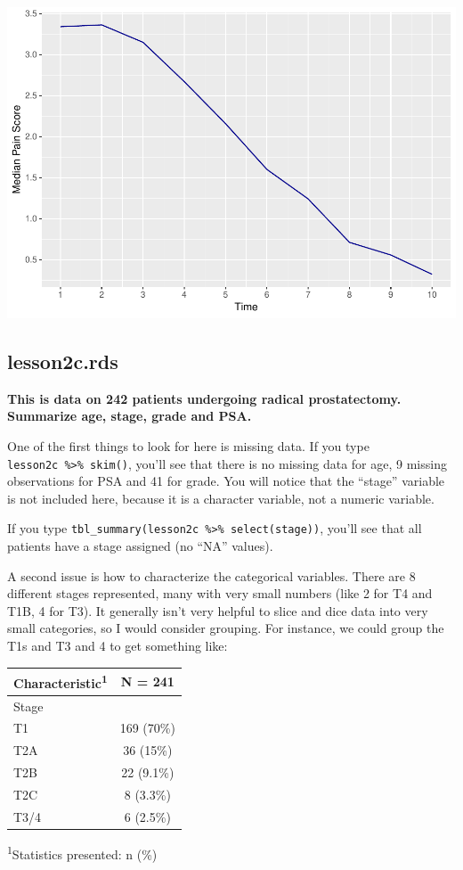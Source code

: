 \documentclass[]{book}
\begin{document}
\includegraphics{09-answers_files/figure-latex/week2f-1.pdf}

\hypertarget{lesson2c.rds}{%
\subsection{lesson2c.rds}\label{lesson2c.rds}}

\textbf{This is data on 242 patients undergoing radical prostatectomy.
Summarize age, stage, grade and PSA.}

One of the first things to look for here is missing data. If you type
\texttt{lesson2c\ \%\textgreater{}\%\ skim()}, you'll see that there is
no missing data for age, 9 missing observations for PSA and 41 for
grade. You will notice that the ``stage'' variable is not included here,
because it is a character variable, not a numeric variable.

If you type
\texttt{tbl\_summary(lesson2c\ \%\textgreater{}\%\ select(stage))},
you'll see that all patients have a stage assigned (no ``NA'' values).

A second issue is how to characterize the categorical variables. There
are 8 different stages represented, many with very small numbers (like 2
for T4 and T1B, 4 for T3). It generally isn't very helpful to slice and
dice data into very small categories, so I would consider grouping. For
instance, we could group the T1s and T3 and 4 to get something like:

\captionsetup[table]{labelformat=empty,skip=1pt}
\begin{longtable}{lc}
\toprule
\textbf{Characteristic}\textsuperscript{1} & \textbf{N = 241} \\ 
\midrule
Stage &  \\ 
T1 & 169 (70\%) \\ 
T2A & 36 (15\%) \\ 
T2B & 22 (9.1\%) \\ 
T2C & 8 (3.3\%) \\ 
T3/4 & 6 (2.5\%) \\ 
\bottomrule
\end{longtable}
\vspace{-5mm}
\begin{minipage}{\linewidth}
\textsuperscript{1}Statistics presented: n (\%) \\ 
\end{minipage}
\end{document}

